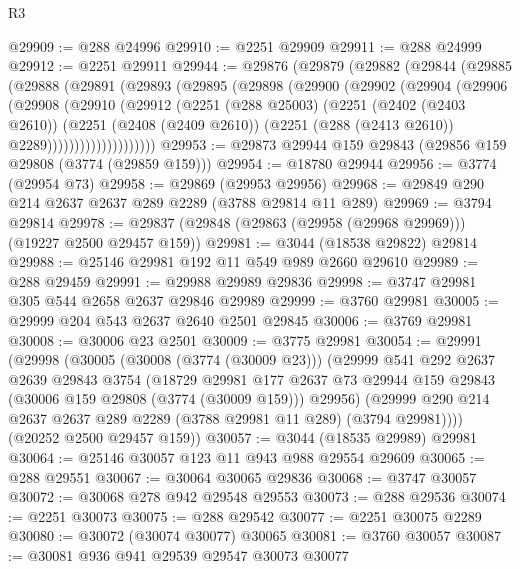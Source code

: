 \begin{lexlean}{R3}
\begin{coremodule}
@29909 := @288 @24996
@29910 := @2251 @29909
@29911 := @288 @24999
@29912 := @2251 @29911
@29944 := @29876
    (@29879
      (@29882
        (@29844
          (@29885
            (@29888
              (@29891
                (@29893
                  (@29895
                    (@29898
                      (@29900
                        (@29902
                          (@29904
                            (@29906
                              (@29908
                                (@29910
                                  (@29912
                                    (@2251
                                      (@288 @25003)
                                      (@2251
                                        (@2402 (@2403 @2610))
                                        (@2251
                                          (@2408 (@2409 @2610))
                                          (@2251 (@288 (@2413 @2610)) @2289))))))))))))))))))))
@29953 := @29873 @29944 @159 @29843 (@29856 @159 @29808 (@3774 (@29859 @159)))
@29954 := @18780 @29944
@29956 := @3774 (@29954 @73)
@29958 := @29869 (@29953 @29956)
@29968 := @29849 @290 @214 @2637 @2637 @289 @2289 (@3788 @29814 @11 @289)
@29969 := @3794 @29814
@29978 := @29837 (@29848 (@29863 (@29958 (@29968 @29969))) (@19227 @2500 @29457 @159))
@29981 := @3044 (@18538 @29822) @29814
@29988 := @25146 @29981 @192 @11 @549 @989 @2660 @29610
@29989 := @288 @29459
@29991 := @29988 @29989 @29836
@29998 := @3747 @29981 @305 @544 @2658 @2637 @29846 @29989
@29999 := @3760 @29981
@30005 := @29999 @204 @543 @2637 @2640 @2501 @29845
@30006 := @3769 @29981
@30008 := @30006 @23 @2501
@30009 := @3775 @29981
@30054 := @29991
    (@29998
      (@30005
        (@30008 (@3774 (@30009 @23)))
        (@29999
          @541
          @292
          @2637
          @2639
          @29843
          @3754
          (@18729
            @29981
            @177
            @2637
            @73
            @29944
            @159
            @29843
            (@30006 @159 @29808 (@3774 (@30009 @159)))
            @29956)
          (@29999 @290 @214 @2637 @2637 @289 @2289 (@3788 @29981 @11 @289) (@3794 @29981))))
      (@20252 @2500 @29457 @159))
@30057 := @3044 (@18535 @29989) @29981
@30064 := @25146 @30057 @123 @11 @943 @988 @29554 @29609
@30065 := @288 @29551
@30067 := @30064 @30065 @29836
@30068 := @3747 @30057
@30072 := @30068 @278 @942 @29548 @29553
@30073 := @288 @29536
@30074 := @2251 @30073
@30075 := @288 @29542
@30077 := @2251 @30075 @2289
@30080 := @30072 (@30074 @30077) @30065
@30081 := @3760 @30057
@30087 := @30081 @936 @941 @29539 @29547 @30073 @30077

\end{coremodule}
\end{lexlean}
